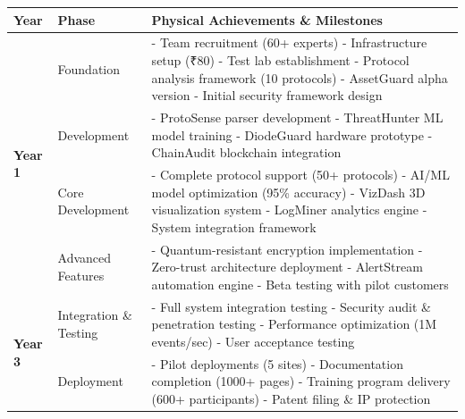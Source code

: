 \documentclass[12pt,a4paper]{article}
\newcommand{\lakhs}{\text{ Lakhs}}
\begin{document}
\begin{longtable}{|p{2cm}|p{4cm}|p{8cm}|}
\hline
\rowcolor{lightblue}
\textbf{Year} & \textbf{Phase} & \textbf{Physical Achievements \& Milestones} \\
\hline
\endhead

\multirow{4}{*}{\textbf{Year 1}} & Foundation & 
- Team recruitment (60+ experts)
- Infrastructure setup (₹80\lakhs)
- Test lab establishment
- Protocol analysis framework (10 protocols)
- AssetGuard alpha version
- Initial security framework design \\
\cline{2-3}
& Development & 
- ProtoSense parser development
- ThreatHunter ML model training
- DiodeGuard hardware prototype
- ChainAudit blockchain integration \\
\hline

\multirow{4}{*}{\textbf{Year 2}} & Core Development & 
- Complete protocol support (50+ protocols)
- AI/ML model optimization (95\% accuracy)
- VizDash 3D visualization system
- LogMiner analytics engine
- System integration framework \\
\cline{2-3}
& Advanced Features & 
- Quantum-resistant encryption implementation
- Zero-trust architecture deployment
- AlertStream automation engine
- Beta testing with pilot customers \\
\hline

\multirow{4}{*}{\textbf{Year 3}} & Integration \& Testing & 
- Full system integration testing
- Security audit \& penetration testing
- Performance optimization (1M events/sec)
- User acceptance testing \\
\cline{2-3}
& Deployment & 
- Pilot deployments (5 sites)
- Documentation completion (1000+ pages)
- Training program delivery (600+ participants)
- Patent filing \& IP protection \\
\hline

\end{longtable}
\end{document}
